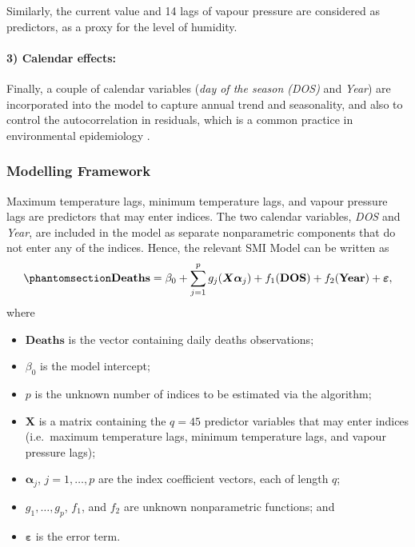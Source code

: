 \documentclass[
  11pt,
  a4paper,
]{article}
\providecommand{\tightlist}{%
  \setlength{\itemsep}{0pt}\setlength{\parskip}{0pt}}\usepackage{longtable,booktabs,array}
\begin{document}
Similarly, the current value and 14 lags of vapour pressure are
considered as predictors, as a proxy for the level of humidity.

\paragraph{3) Calendar effects:}\label{calendar-effects}

Finally, a couple of calendar variables (\emph{day of the season (DOS)}
and \emph{Year}) are incorporated into the model to capture annual trend
and seasonality, and also to control the autocorrelation in residuals,
which is a common practice in environmental epidemiology
\autocite{Masselot2022}.

\subsubsection{Modelling Framework}\label{modelling-framework}

Maximum temperature lags, minimum temperature lags, and vapour pressure
lags are predictors that may enter indices. The two calendar variables,
\emph{DOS} and \emph{Year}, are included in the model as separate
nonparametric components that do not enter any of the indices. Hence,
the relevant SMI Model can be written as
\begin{equation}\phantomsection\label{eq-heat}{
  \textbf{Deaths} = \beta_{0} + \sum_{j = 1}^{p}{g_{j}(\bm{X}\bm{\alpha}_{j})} + f_{1}(\textbf{DOS}) + f_{2}(\textbf{Year})+ \bm{\varepsilon},
}\end{equation} where

\begin{itemize}
\tightlist
\item
  \(\textbf{Deaths}\) is the vector containing daily deaths
  observations;
\item
  \(\beta_{0}\) is the model intercept;
\item
  \(p\) is the unknown number of indices to be estimated via the
  algorithm;
\item
  \(\bm{X}\) is a matrix containing the \(q=45\) predictor variables
  that may enter indices (i.e.~maximum temperature lags, minimum
  temperature lags, and vapour pressure lags);
\item
  \(\bm{\alpha}_{j}\), \(j = 1, \dots, p\) are the index coefficient
  vectors, each of length \(q\);
\item
  \(g_{1}, \dots,g_p\), \(f_{1}\), and \(f_{2}\) are unknown
  nonparametric functions; and
\item
  \(\bm{\varepsilon}\) is the error term.
\end{itemize}
\end{document}

